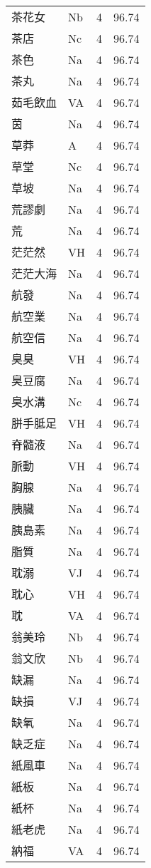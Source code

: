 \documentclass[twocolumn]{book}
\begin{document}
\begin{supertabular}{llrr}
茶花女 & Nb & 4 &  96.74\\
茶店 & Nc & 4 &  96.74\\
茶色 & Na & 4 &  96.74\\
茶丸 & Na & 4 &  96.74\\
茹毛飲血 & VA & 4 &  96.74\\
茵 & Na & 4 &  96.74\\
草莽 & A & 4 &  96.74\\
草堂 & Nc & 4 &  96.74\\
草坡 & Na & 4 &  96.74\\
荒謬劇 & Na & 4 &  96.74\\
荒 & Na & 4 &  96.74\\
茫茫然 & VH & 4 &  96.74\\
茫茫大海 & Na & 4 &  96.74\\
航發 & Na & 4 &  96.74\\
航空業 & Na & 4 &  96.74\\
航空信 & Na & 4 &  96.74\\
臭臭 & VH & 4 &  96.74\\
臭豆腐 & Na & 4 &  96.74\\
臭水溝 & Nc & 4 &  96.74\\
胼手胝足 & VH & 4 &  96.74\\
脊髓液 & Na & 4 &  96.74\\
脈動 & VH & 4 &  96.74\\
胸腺 & Na & 4 &  96.74\\
胰臟 & Na & 4 &  96.74\\
胰島素 & Na & 4 &  96.74\\
脂質 & Na & 4 &  96.74\\
耽溺 & VJ & 4 &  96.74\\
耽心 & VH & 4 &  96.74\\
耽 & VA & 4 &  96.74\\
翁美玲 & Nb & 4 &  96.74\\
翁文欣 & Nb & 4 &  96.74\\
缺漏 & Na & 4 &  96.74\\
缺損 & VJ & 4 &  96.74\\
缺氧 & Na & 4 &  96.74\\
缺乏症 & Na & 4 &  96.74\\
紙風車 & Na & 4 &  96.74\\
紙板 & Na & 4 &  96.74\\
紙杯 & Na & 4 &  96.74\\
紙老虎 & Na & 4 &  96.74\\
納福 & VA & 4 &  96.74\\

\end{supertabular}
\end{document}
